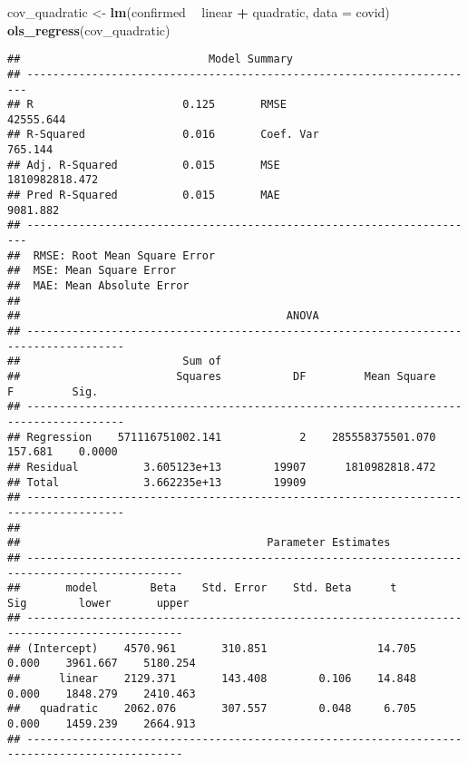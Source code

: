 \documentclass[]{article}
\newenvironment{Shaded}{\begin{snugshade}}{\end{snugshade}}
\newcommand{\KeywordTok}[1]{\textcolor[rgb]{0.13,0.29,0.53}{\textbf{#1}}}
\newcommand{\DataTypeTok}[1]{\textcolor[rgb]{0.13,0.29,0.53}{#1}}
\newcommand{\StringTok}[1]{\textcolor[rgb]{0.31,0.60,0.02}{#1}}
\newcommand{\OperatorTok}[1]{\textcolor[rgb]{0.81,0.36,0.00}{\textbf{#1}}}
\newcommand{\NormalTok}[1]{#1}
\begin{document}
\begin{Shaded}
\begin{Highlighting}[]
\NormalTok{cov_quadratic <-}\StringTok{ }\KeywordTok{lm}\NormalTok{(confirmed }\OperatorTok{~}\StringTok{ }\NormalTok{linear }\OperatorTok{+}\StringTok{ }\NormalTok{quadratic, }\DataTypeTok{data =}\NormalTok{ covid)}
\KeywordTok{ols_regress}\NormalTok{(cov_quadratic)}
\end{Highlighting}
\end{Shaded}

\begin{verbatim}
##                             Model Summary                              
## ----------------------------------------------------------------------
## R                       0.125       RMSE                    42555.644 
## R-Squared               0.016       Coef. Var                 765.144 
## Adj. R-Squared          0.015       MSE                1810982818.472 
## Pred R-Squared          0.015       MAE                      9081.882 
## ----------------------------------------------------------------------
##  RMSE: Root Mean Square Error 
##  MSE: Mean Square Error 
##  MAE: Mean Absolute Error 
## 
##                                         ANOVA                                         
## -------------------------------------------------------------------------------------
##                         Sum of                                                       
##                        Squares           DF         Mean Square       F         Sig. 
## -------------------------------------------------------------------------------------
## Regression    571116751002.141            2    285558375501.070    157.681    0.0000 
## Residual          3.605123e+13        19907      1810982818.472                      
## Total             3.662235e+13        19909                                          
## -------------------------------------------------------------------------------------
## 
##                                      Parameter Estimates                                       
## ----------------------------------------------------------------------------------------------
##       model        Beta    Std. Error    Std. Beta      t        Sig        lower       upper 
## ----------------------------------------------------------------------------------------------
## (Intercept)    4570.961       310.851                 14.705    0.000    3961.667    5180.254 
##      linear    2129.371       143.408        0.106    14.848    0.000    1848.279    2410.463 
##   quadratic    2062.076       307.557        0.048     6.705    0.000    1459.239    2664.913 
## ----------------------------------------------------------------------------------------------
\end{verbatim}
\end{document}
